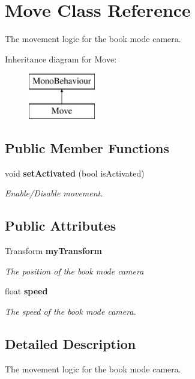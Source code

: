 \section{Move Class Reference}
\label{class_move}


The movement logic for the book mode camera.  


Inheritance diagram for Move\+:\begin{figure}[H]
\begin{center}
\leavevmode
\includegraphics[height=2.000000cm]{class_move}
\end{center}
\end{figure}
\subsection*{Public Member Functions}
\begin{DoxyCompactItemize}
\item 
void {\bf set\+Activated} (bool is\+Activated)
\begin{DoxyCompactList}\small\item\em Enable/\+Disable movement. \end{DoxyCompactList}\end{DoxyCompactItemize}
\subsection*{Public Attributes}
\begin{DoxyCompactItemize}
\item 
Transform {\bf my\+Transform}
\begin{DoxyCompactList}\small\item\em The position of the book mode camera \end{DoxyCompactList}\item 
float {\bf speed}
\begin{DoxyCompactList}\small\item\em The speed of the book mode camera. \end{DoxyCompactList}\end{DoxyCompactItemize}


\subsection{Detailed Description}
The movement logic for the book mode camera. 



